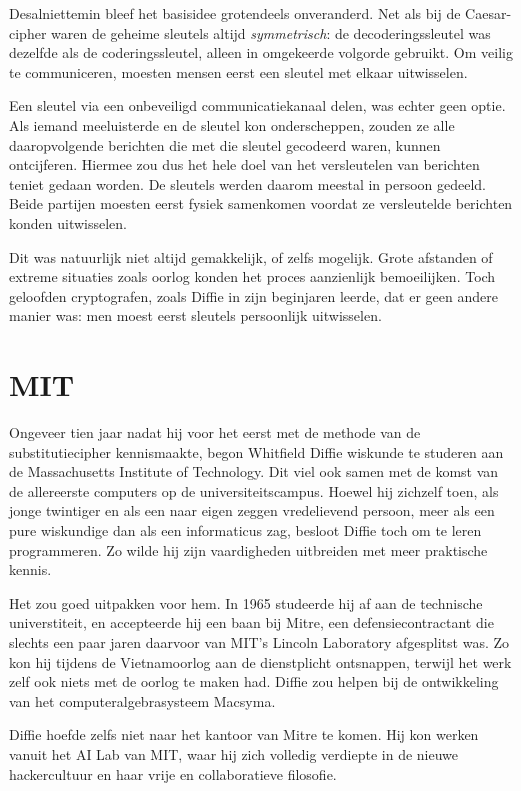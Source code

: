 \documentclass[
  a5paper,
  smalldemyvopaper,11pt,twoside,onecolumn,openright,extrafontsizes,
hidelinks]{memoir}
\begin{document}
Desalniettemin bleef het basisidee grotendeels onveranderd. Net als bij
de Caesar-cipher waren de geheime sleutels altijd \emph{symmetrisch}: de
decoderingssleutel was dezelfde als de coderingssleutel, alleen in
omgekeerde volgorde gebruikt. Om veilig te communiceren, moesten mensen
eerst een sleutel met elkaar uitwisselen.

Een sleutel via een onbeveiligd communicatiekanaal delen, was echter
geen optie. Als iemand meeluisterde en de sleutel kon onderscheppen,
zouden ze alle daaropvolgende berichten die met die sleutel gecodeerd
waren, kunnen ontcijferen. Hiermee zou dus het hele doel van het
versleutelen van berichten teniet gedaan worden. De sleutels werden
daarom meestal in persoon gedeeld. Beide partijen moesten eerst fysiek
samenkomen voordat ze versleutelde berichten konden uitwisselen.

Dit was natuurlijk niet altijd gemakkelijk, of zelfs mogelijk. Grote
afstanden of extreme situaties zoals oorlog konden het proces
aanzienlijk bemoeilijken. Toch geloofden cryptografen, zoals Diffie in
zijn beginjaren leerde, dat er geen andere manier was: men moest eerst
sleutels persoonlijk uitwisselen.

\section{MIT}\label{mit}

Ongeveer tien jaar nadat hij voor het eerst met de methode van de
substitutiecipher kennismaakte, begon Whitfield Diffie wiskunde te
studeren aan de Massachusetts Institute of Technology. Dit viel ook
samen met de komst van de allereerste computers op de
universiteitscampus. Hoewel hij zichzelf toen, als jonge twintiger en
als een naar eigen zeggen vredelievend persoon, meer als een pure
wiskundige dan als een informaticus zag, besloot Diffie toch om te leren
programmeren. Zo wilde hij zijn vaardigheden uitbreiden met meer
praktische kennis.

Het zou goed uitpakken voor hem. In 1965 studeerde hij af aan de
technische universtiteit, en accepteerde hij een baan bij Mitre, een
defensiecontractant die slechts een paar jaren daarvoor van MIT's
Lincoln Laboratory afgesplitst was. Zo kon hij tijdens de Vietnamoorlog
aan de dienstplicht ontsnappen, terwijl het werk zelf ook niets met de
oorlog te maken had. Diffie zou helpen bij de ontwikkeling van het
computeralgebrasysteem Macsyma.

Diffie hoefde zelfs niet naar het kantoor van Mitre te komen. Hij kon
werken vanuit het AI Lab van MIT, waar hij zich volledig verdiepte in de
nieuwe hackercultuur en haar vrije en collaboratieve filosofie.
\end{document}
